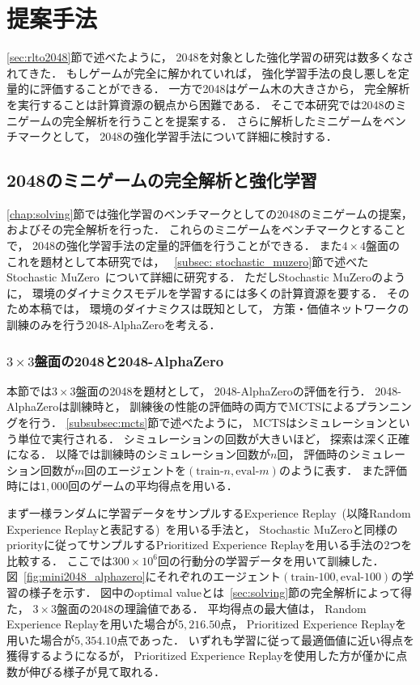 \chapter{提案手法}
\label{chap:proposal}
\ref{sec:rlto2048}節で述べたように， 2048を対象とした強化学習の研究は数多くなされてきた．
もしゲームが完全に解かれていれば， 強化学習手法の良し悪しを定量的に評価することができる．
一方で2048はゲーム木の大きさから， 完全解析を実行することは計算資源の観点から困難である．
そこで本研究では2048のミニゲームの完全解析を行うことを提案する．
さらに解析したミニゲームをベンチマークとして， 2048の強化学習手法について詳細に検討する．



\section{2048のミニゲームの完全解析と強化学習}
\ref{chap:solving}節では強化学習のベンチマークとしての2048のミニゲームの提案， およびその完全解析を行った．
これらのミニゲームをベンチマークとすることで， 2048の強化学習手法の定量的評価を行うことができる．
また$4\times4$盤面の
これを題材として本研究では， ~\ref{subsec: stochastic_muzero}節で述べたStochastic MuZero~\cite{StochasticMuZero}について詳細に研究する．
ただしStochastic MuZeroのように， 環境のダイナミクスモデルを学習するには多くの計算資源を要する．
そのため本稿では， 環境のダイナミクスは既知として， 方策・価値ネットワークの訓練のみを行う2048-AlphaZeroを考える．

\subsection{$3\times3$盤面の2048と2048-AlphaZero}
本節では$3\times3$盤面の2048を題材として， 2048-AlphaZeroの評価を行う．
2048-AlphaZeroは訓練時と， 訓練後の性能の評価時の両方でMCTSによるプランニングを行う．
\ref{subsubsec:mcts}節で述べたように， MCTSはシミュレーションという単位で実行される．
シミュレーションの回数が大きいほど， 探索は深く正確になる．
以降では訓練時のシミュレーション回数が$n$回， 評価時のシミュレーション回数が$m$回のエージェントを$(\text{train-}n,\text{eval-}m)$のように表す．
また評価時には$1,000$回のゲームの平均得点を用いる．

まず一様ランダムに学習データをサンプルするExperience Replay~(以降Random Experience Replayと表記する)~を用いる手法と， Stochastic MuZeroと同様のpriorityに従ってサンプルするPrioritized Experience Replayを用いる手法の$2$つを比較する．
ここでは$300\times{10}^6$回の行動分の学習データを用いて訓練した．
図~\ref{fig:mini2048_alphazero}にそれぞれのエージェント$(\text{train-}100,\text{eval-}100)$の学習の様子を示す．
図中のoptimal valueとは~\ref{sec:solving}節の完全解析によって得た， $3\times3$盤面の2048の理論値である．
平均得点の最大値は， Random Experience Replayを用いた場合が$5,216.50$点， Prioritized Experience Replayを用いた場合が$5,354.10$点であった．
いずれも学習に従って最適価値に近い得点を獲得するようになるが， Prioritized Experience Replayを使用した方が僅かに点数が伸びる様子が見て取れる．

